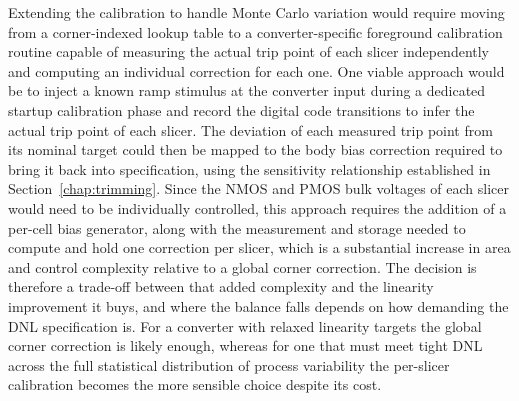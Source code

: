 Extending the calibration to handle Monte Carlo variation would require moving from a
corner-indexed lookup table to a converter-specific foreground calibration routine capable of
measuring the actual trip point of each slicer independently and computing an individual
correction for each one. One viable approach would be to inject a known ramp stimulus at the
converter input during a dedicated startup calibration phase and record the digital code transitions
to infer the actual trip point of each slicer. The deviation of each measured trip point from its
nominal target could then be mapped to the body bias correction required to bring it back into
specification, using the sensitivity relationship established in Section~\ref{chap:trimming}. Since the NMOS and
PMOS bulk voltages of each slicer would need to be individually controlled, this approach
requires the addition of a per-cell bias generator, along with the measurement and storage
needed to compute and hold one correction per slicer, which is a substantial increase in area and
control complexity relative to a global corner correction. The decision is therefore a trade-off
between that added complexity and the linearity improvement it buys, and where the balance falls
depends on how demanding the DNL specification is. For a converter with relaxed linearity targets
the global corner correction is likely enough, whereas for one that must meet tight DNL across the
full statistical distribution of process variability the per-slicer calibration becomes the more
sensible choice despite its cost.